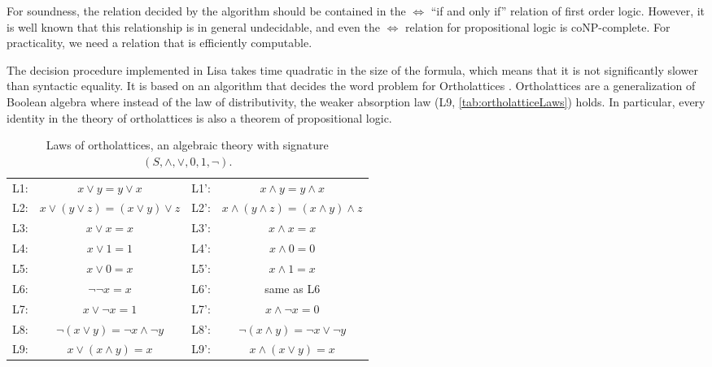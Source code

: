 For soundness, the relation decided by the algorithm should be contained in the $\iff$ ``if and only if'' relation of first order logic. However, it is well known that this relationship is in general undecidable, and even the $\iff$ relation for propositional logic is coNP-complete. For practicality, we need a relation that is efficiently computable.

The decision procedure implemented in Lisa takes time quadratic in the size of the formula, which means that it is not significantly slower than syntactic equality.
It is based on an algorithm that decides the word problem for Ortholattices \cite{guilloudFormulaNormalizationsVerification2023}.
Ortholattices are a generalization of Boolean algebra where instead of the law of distributivity, the weaker absorption law (L9, \autoref{tab:ortholatticeLaws}) holds. In particular, every identity in the theory of ortholattices is also a theorem of propositional logic.
\begin{table}[bth]
  \centering
  \begin{tabular}{r c @{\hskip 2em} | @{\hskip 2em} r c}
    L1: & $x \lor y = y \lor x$                    & L1': & $x \land y = y \land x$                      \\
    L2: & $x \lor ( y \lor z) = (x \lor y) \lor z$ & L2': & $x \land ( y \land z) = (x \land y) \land z$ \\
    L3: & $x \lor x = x$                           & L3': & $x \land x = x$                              \\
    L4: & $x \lor 1 = 1$                           & L4': & $x \land 0 = 0$                              \\
    L5: & $x \lor 0 = x$                           & L5': & $x \land 1 = x$                              \\
    L6: & $\neg \neg x = x$                        & L6': & same as L6                                   \\
    L7: & $x \lor \neg x = 1$                      & L7': & $x \land \neg x = 0$                         \\
    L8: & $\neg (x \lor y) = \neg x \land \neg y$  & L8': & $\neg (x \land y) = \neg x \lor \neg y$      \\
    L9: & $x \lor (x \land y) = x$                 & L9': & $x \land (x \lor y) = x$                     \\
  \end{tabular}
  \caption{Laws of ortholattices, an algebraic theory with signature $(S, \land, \lor, 0, 1, \neg)$.}
  \label{tab:ortholatticeLaws}
\end{table}

